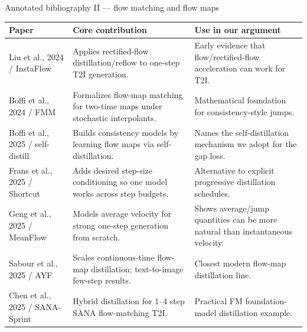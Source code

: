 \documentclass[aspectratio=169,10pt]{beamer}
\begin{document}
\begin{frame}[shrink=6]{Annotated bibliography II --- flow matching and flow maps}
  \scriptsize
  \begin{adjustbox}{max width=\textwidth, max height=0.80\textheight, center}
  \begin{tabular}{@{}L{0.22\textwidth}L{0.34\textwidth}L{0.34\textwidth}@{}}
    \toprule
    \textbf{Paper} & \textbf{Core contribution} & \textbf{Use in our argument} \\
    \midrule
    Liu et al., 2024 / InstaFlow & Applies rectified-flow distillation/reflow to one-step T2I generation. & Early evidence that flow/rectified-flow acceleration can work for T2I. \\
    Boffi et al., 2024 / FMM & Formalizes flow-map matching for two-time maps under stochastic interpolants. & Mathematical foundation for consistency-style jumps. \\
    Boffi et al., 2025 / self-distill & Builds consistency models by learning flow maps via self-distillation. & Names the self-distillation mechanism we adopt for the gap loss. \\
    Frans et al., 2025 / Shortcut & Adds desired step-size conditioning so one model works across step budgets. & Alternative to explicit progressive distillation schedules. \\
    Geng et al., 2025 / MeanFlow & Models average velocity for strong one-step generation from scratch. & Shows average/jump quantities can be more natural than instantaneous velocity. \\
    Sabour et al., 2025 / AYF & Scales continuous-time flow-map distillation; text-to-image few-step results. & Closest modern flow-map distillation line. \\
    Chen et al., 2025 / SANA-Sprint & Hybrid distillation for 1--4 step SANA flow-matching T2I. & Practical FM foundation-model distillation example. \\
    \bottomrule
  \end{tabular}
  \end{adjustbox}
\end{frame}
\end{document}

